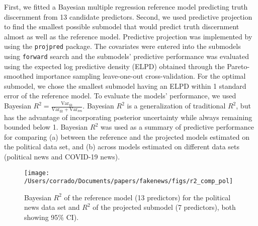 \documentclass[
  english,
  man,floatsintext]{apa6}
\begin{document}
First, we fitted a Bayesian multiple regression reference model predicting truth discernment from 13 candidate predictors. Second, we used predictive projection to find the smallest possible submodel that would predict truth discernment almost as well as the reference model. Predictive projection was implemented by using the \texttt{projpred} package. The covariates were entered into the submodels using \texttt{forward} search and the submodels' predictive performance was evaluated using the expected log predictive density (ELPD) obtained through the Pareto-smoothed importance sampling leave-one-out cross-validation. For the optimal submodel, we chose the smallest submodel having an ELPD within 1 standard error of the reference model. To evaluate the models' performance, we used Bayesian \(R^2 = \frac{\text{Var}_{\text{fit}}}{\text{Var}_{\text{fit}} + \text{Var}_{\text{res}}}\). Bayesian \(R^2\) is a generalization of traditional \(R^2\), but has the advantage of incorporating posterior uncertainty while always remaining bounded below 1. Bayesian \(R^2\) was used as a summary of predictive performance for comparing (a) between the reference and the projected models estimated on the political data set, and (b) across models estimated on different data sets (political news and COVID-19 news).



\begin{figure}

{\centering \texttt{[image: /Users/corrado/Documents/papers/fakenews/figs/r2\_comp\_pol]} 

}

\caption{Bayesian \(R^2\) of the reference model (13 predictors) for the political news data set and \(R^2\) of the projected submodel (7 predictors), both showing 95\% CI).}\label{fig:figr2refprojpol}
\end{figure}
\end{document}
